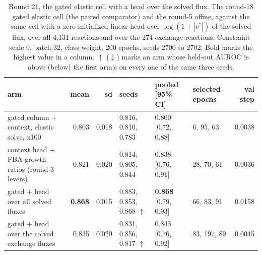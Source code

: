 \begin{table}[H]
  \centering
  \footnotesize
  \caption[Round 21, the gated elastic cell with a head over the solved flux]{Round 21, the gated elastic cell with a head over the solved flux. The round-18 gated elastic cell (the paired comparator) and the round-5 affine, against the same cell with a zero-initialized linear head over $\log(1 + |v^*|)$ of the solved flux, over all 4,131 reactions and over the 274 exchange reactions. Constraint scale 0, batch 32, class weight, 200 epochs, seeds 2700 to 2702. Bold marks the highest value in a column. $\uparrow$ ($\downarrow$) marks an arm whose held-out AUROC is above (below) the first arm's on every one of the same three seeds.}
  \label{tab:w37}
  \begin{tabular}{@{}lrrlllr@{}}
    \hline
    arm & mean & sd & seeds & pooled [95\% CI] & selected epochs & val step \\
    \hline
    gated column $+$ context, elastic solve, x100 & 0.803 & 0.018 & 0.816, 0.810, 0.783 & 0.800 [0.72, 0.88] & 6, 95, 63 & 0.0038 \\
    context head $+$ FBA growth ratios (round-3 levers) & 0.821 & 0.020 & 0.814, 0.805, 0.844 & 0.838 [0.76, 0.91] & 28, 70, 61 & 0.0036 \\
    gated $+$ head over all solved fluxes & \textbf{0.868} & 0.015 & 0.883, 0.853, 0.868 $\uparrow$ & \textbf{0.868} [0.79, 0.93] & 66, 83, 91 & 0.0158 \\
    gated $+$ head over the solved exchange fluxes & 0.835 & 0.020 & 0.831, 0.856, 0.817 $\uparrow$ & 0.843 [0.76, 0.92] & 83, 197, 89 & 0.0045 \\
    \hline
  \end{tabular}
\end{table}
